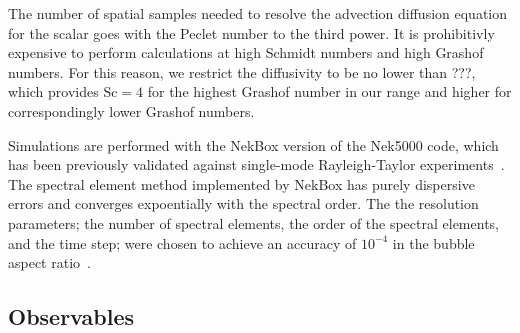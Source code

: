 The number of spatial samples needed to resolve the advection diffusion equation for the scalar goes with the Peclet number to the third power.
It is prohibitivly expensive to perform calculations at high Schmidt numbers and high Grashof numbers.  
For this reason, we restrict the diffusivity to be no lower than ???, which provides $\text{Sc} = 4$ for the highest Grashof number in our range and higher for correspondingly lower Grashof numbers.

Simulations are performed with the NekBox version of the Nek5000 code, which has been previously validated against single-mode Rayleigh-Taylor experiments~\cite{Validation2016,Wilkinson2007}.
The spectral element method implemented by NekBox has purely dispersive errors and converges expoentially with the spectral order.
The the resolution parameters; the number of spectral elements, the order of the spectral elements, and the time step; were chosen to achieve an accuracy of $10^{-4}$ in the bubble aspect ratio~\cite{Convergence2016}.

\subsection{Observables}

